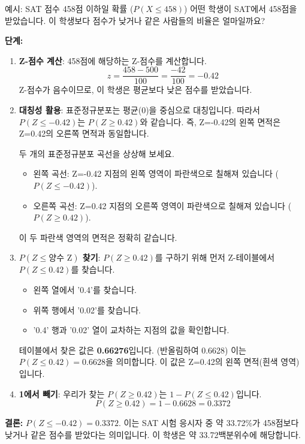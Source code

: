 \documentclass[11pt,a4paper]{article}
\begin{document}
\begin{examplebox}{예시: SAT 점수 458점 이하일 확률 ($P(X \le 458)$)}
어떤 학생이 SAT에서 458점을 받았습니다. 이 학생보다 점수가 낮거나 같은 사람들의 비율은 얼마일까요?

\textbf{단계:}
\begin{enumerate}
    \item \textbf{Z-점수 계산}: 458점에 해당하는 Z-점수를 계산합니다.
    \[ z = \frac{458 - 500}{100} = \frac{-42}{100} = -0.42 \]
    Z-점수가 음수이므로, 이 학생은 평균보다 낮은 점수를 받았습니다.
    \item \textbf{대칭성 활용}: 표준정규분포는 평균(0)을 중심으로 대칭입니다. 따라서 $P(Z \le -0.42)$는 $P(Z \ge 0.42)$와 같습니다. 즉, Z=-0.42의 왼쪽 면적은 Z=0.42의 오른쪽 면적과 동일합니다.
    \begin{tcolorbox}[title=\textbf{시각적 이해: 대칭성}, colback=blue!5!white, colframe=blue!75!black]
    두 개의 표준정규분포 곡선을 상상해 보세요.
    \begin{itemize}
        \item 왼쪽 곡선: Z=-0.42 지점의 왼쪽 영역이 파란색으로 칠해져 있습니다 ($P(Z \le -0.42)$).
        \item 오른쪽 곡선: Z=0.42 지점의 오른쪽 영역이 파란색으로 칠해져 있습니다 ($P(Z \ge 0.42)$).
    \end{itemize}
    이 두 파란색 영역의 면적은 정확히 같습니다.
    \end{tcolorbox}
    \item \textbf{$P(Z \le \text{양수 Z})$ 찾기}: $P(Z \ge 0.42)$를 구하기 위해 먼저 Z-테이블에서 $P(Z \le 0.42)$를 찾습니다.
    \begin{itemize}
        \item 왼쪽 열에서 '0.4'를 찾습니다.
        \item 위쪽 행에서 '0.02'를 찾습니다.
        \item '0.4' 행과 '0.02' 열이 교차하는 지점의 값을 확인합니다.
    \end{itemize}
    테이블에서 찾은 값은 \textbf{0.66276}입니다. (반올림하여 0.6628)
    이는 $P(Z \le 0.42) = 0.6628$을 의미합니다. 이 값은 Z=0.42의 왼쪽 면적(흰색 영역)입니다.
    \item \textbf{1에서 빼기}: 우리가 찾는 $P(Z \ge 0.42)$는 $1 - P(Z \le 0.42)$입니다.
    \[ P(Z \ge 0.42) = 1 - 0.6628 = 0.3372 \]
\end{enumerate}
\textbf{결론:} $P(Z \le -0.42) = 0.3372$. 이는 SAT 시험 응시자 중 약 33.72\%가 458점보다 낮거나 같은 점수를 받았다는 의미입니다. 이 학생은 약 33.72백분위수에 해당합니다.
\end{examplebox}
\end{document}

